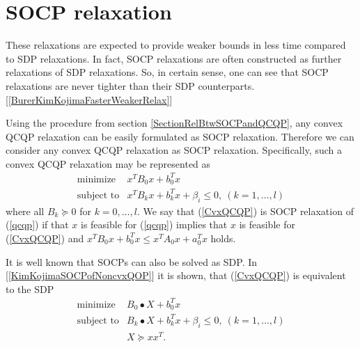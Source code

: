\documentclass[10pt,oneside]{book}
\theoremstyle{definition}
\begin{document}
\section{SOCP relaxation}
These relaxations are expected to provide weaker bounds in less time compared to SDP relaxations. In fact, SOCP relaxations are often constructed as further relaxations of SDP relaxations. So, in certain sense, one can see that SOCP relaxations are never tighter than their SDP counterparts. [\ref{BurerKimKojimaFasterWeakerRelax}]

Using the procedure from section \ref{SectionRelBtwSOCPandQCQP}, any convex QCQP relaxation can be easily formulated as SOCP relaxation. Therefore we can consider any convex QCQP relaxation as SOCP relaxation. 
Specifically, such a convex QCQP relaxation may be represented as 
\begin{equation}
\label{CvxQCQP} 
\begin{array}{ll}
\mbox{minimize}& x^TB_0x + b_0^Tx \\
\mbox{subject to}& x^TB_kx + b_k^Tx + \beta_i \leq 0, \  (k = 1,\dots ,l)
\end{array} 
\end{equation}
where all $B_k\succeq 0$ for $k=0,\dots ,l$. We say that (\ref{CvxQCQP}) is SOCP relaxation of (\ref{qcqp}) if that $x$ is feasible for (\ref{qcqp}) implies that $x$ is feasible for (\ref{CvxQCQP}) and $x^TB_0x+b_0^Tx \leq x^TA_0x+a_0^Tx$ holds.

It is well known that SOCPs can also be solved as SDP. In [\ref{KimKojimaSOCPofNoncvxQOP}] it is shown, that (\ref{CvxQCQP}) is equivalent to the SDP 
\begin{equation}
\label{SDPofCvxQCQP} 
\begin{array}{ll}
\mbox{minimize}& B_0\bullet X + b_0^Tx \\
\mbox{subject to}& B_k\bullet X + b_k^Tx + \beta_i \leq 0, \  (k = 1,\dots ,l)\\
& X\succeq xx^T.
\end{array} 
\end{equation}
\end{document}
